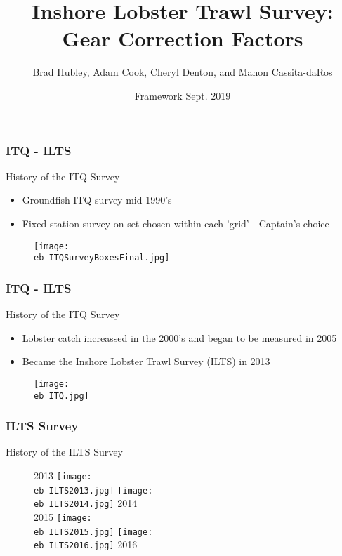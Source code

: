 \documentclass{beamer}
\title[ILTS Gear correction]{Inshore Lobster Trawl Survey: Gear Correction Factors}
\author[Hubley, Cook, Denton, Cassita-daRos]{Brad Hubley, Adam Cook, Cheryl Denton, and Manon Cassita-daRos}
\institute[DFO]{Science Branch, Fisheries and Oceans Canada}
\date{Framework Sept. 2019}
\newcommand{\eb}{\string~/bio.data/bio.lobster/figures/ILTS/} %
\begin{document}
 
\frame{\titlepage}
 

\begin{frame}
\frametitle{ITQ - ILTS}
History of the ITQ Survey
\begin{itemize}
    \item Groundfish ITQ survey mid-1990's
    \item Fixed station survey on set chosen within each 'grid' - Captain's choice
\end{itemize}
 
\begin{figure}
        \begin{center}
            \texttt{[image: \\eb ITQSurveyBoxesFinal.jpg]}
   \vspace{1cm}
    \end{center}
   
 \end{figure}

\end{frame}


\begin{frame}
\frametitle{ITQ - ILTS}
History of the ITQ Survey
\begin{itemize}
    \item Lobster catch increassed in the 2000's and began to be measured in 2005
    \item Became the Inshore Lobster Trawl Survey (ILTS) in 2013
\end{itemize}
 
\begin{figure}
        \begin{center}
            \texttt{[image: \\eb ITQ.jpg]}
   \vspace{1cm}
    \end{center}
   
 \end{figure}

\end{frame}



\begin{frame}
\frametitle{ILTS Survey}
History of the ILTS Survey
 
\begin{figure}
        \begin{center}
            2013
            \texttt{[image: \\eb ILTS2013.jpg]}
            \texttt{[image: \\eb ILTS2014.jpg]}
            2014\\
            2015
            \texttt{[image: \\eb ILTS2015.jpg]}
            \texttt{[image: \\eb ILTS2016.jpg]}
            2016
    \end{center}
   
 \end{figure}

\end{frame}
\end{document}
